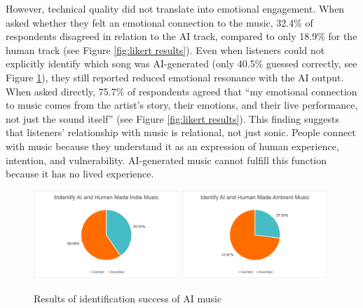\documentclass{article}
\begin{document}
However, technical quality did not translate into emotional engagement. When asked whether they felt an emotional connection to the music, 32.4\% of respondents disagreed in relation to the AI track, compared to only 18.9\% for the human track (see Figure \ref{fig:likert results}). Even when listeners could not explicitly identify which song was AI-generated (only 40.5\% guessed correctly, see Figure \ref{fig:comparison}), they still reported reduced emotional resonance with the AI output. When asked directly, 75.7\% of respondents agreed that ``my emotional connection to music comes from the artist's story, their emotions, and their live performance, not just the sound itself'' (see Figure \ref{fig:likert results}). This finding suggests that listeners' relationship with music is relational, not just sonic. People connect with music because they understand it as an expression of human experience, intention, and vulnerability. AI-generated music cannot fulfill this function because it has no lived experience.

\begin{figure}[h]
    \centering
    \includegraphics[width=0.49\textwidth]{Inide ID.png}
    \hfill
    \includegraphics[width=0.49\textwidth]{Ambient ID.png}
    \caption{Results of identification success of AI music}
    \label{fig:comparison}
\end{figure}
\end{document}
